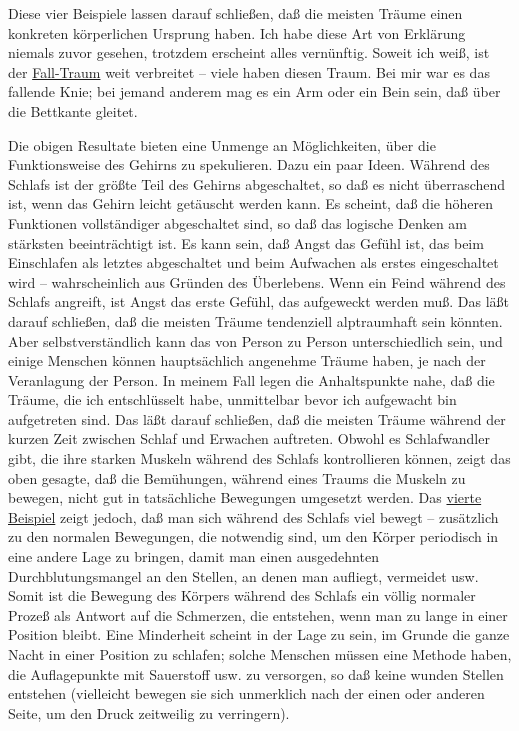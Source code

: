 Diese vier Beispiele lassen darauf schließen, daß die meisten Träume einen konkreten körperlichen Ursprung haben.
Ich habe diese Art von Erklärung niemals zuvor gesehen, trotzdem erscheint alles vernünftig.
Soweit ich weiß, ist der \hyperref[c3_5b]{Fall-Traum} weit verbreitet -- viele haben diesen Traum.
Bei mir war es das fallende Knie; bei jemand anderem mag es ein Arm oder ein Bein sein, daß über die Bettkante gleitet.

Die obigen Resultate bieten eine Unmenge an Möglichkeiten, über die Funktionsweise des Gehirns zu spekulieren.
Dazu ein paar Ideen.
Während des Schlafs ist der größte Teil des Gehirns abgeschaltet, so daß es nicht überraschend ist, wenn das Gehirn leicht getäuscht werden kann.
Es scheint, daß die höheren Funktionen vollständiger abgeschaltet sind, so daß das logische Denken am stärksten beeinträchtigt ist.
Es kann sein, daß Angst das Gefühl ist, das beim Einschlafen als letztes abgeschaltet und beim Aufwachen als erstes eingeschaltet wird -- wahrscheinlich aus Gründen des Überlebens.
Wenn ein Feind während des Schlafs angreift, ist Angst das erste Gefühl, das aufgeweckt werden muß.
Das läßt darauf schließen, daß die meisten Träume tendenziell alptraumhaft sein könnten.
Aber selbstverständlich kann das von Person zu Person unterschiedlich sein, und einige Menschen können hauptsächlich angenehme Träume haben, je nach der Veranlagung der Person.
In meinem Fall legen die Anhaltspunkte nahe, daß die Träume, die ich entschlüsselt habe, unmittelbar bevor ich aufgewacht bin aufgetreten sind.
Das läßt darauf schließen, daß die meisten Träume während der kurzen Zeit zwischen Schlaf und Erwachen auftreten.
Obwohl es Schlafwandler gibt, die ihre starken Muskeln während des Schlafs kontrollieren können, zeigt das oben gesagte, daß die Bemühungen, während eines Traums die Muskeln zu bewegen, nicht gut in tatsächliche Bewegungen umgesetzt werden.
Das \hyperref[c3_5e]{vierte Beispiel} zeigt jedoch, daß man sich während des Schlafs viel bewegt -- zusätzlich zu den normalen Bewegungen, die notwendig sind, um den Körper periodisch in eine andere Lage zu bringen, damit man einen ausgedehnten Durchblutungsmangel an den Stellen, an denen man aufliegt, vermeidet usw.
Somit ist die Bewegung des Körpers während des Schlafs ein völlig normaler Prozeß als Antwort auf die Schmerzen, die entstehen, wenn man zu lange in einer Position bleibt.
Eine Minderheit scheint in der Lage zu sein, im Grunde die ganze Nacht in einer Position zu schlafen; solche Menschen müssen eine Methode haben, die Auflagepunkte mit Sauerstoff usw. zu versorgen, so daß keine wunden Stellen entstehen (vielleicht bewegen sie sich unmerklich nach der einen oder anderen Seite, um den Druck zeitweilig zu verringern).

